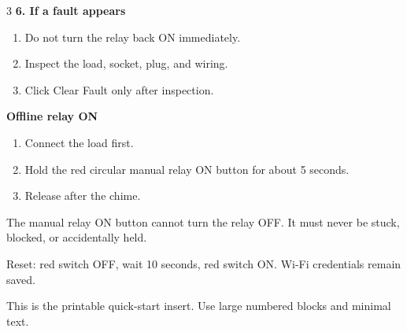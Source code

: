\documentclass[10pt,a4paper,landscape]{article}
\begin{document}
\begin{multicols}{3}
\textbf{6. If a fault appears}
\begin{enumerate}
  \item Do not turn the relay back ON immediately.
  \item Inspect the load, socket, plug, and wiring.
  \item Click Clear Fault only after inspection.
\end{enumerate}

\columnbreak

\textbf{Offline relay ON}
\begin{enumerate}
  \item Connect the load first.
  \item Hold the red circular manual relay ON button for about 5 seconds.
  \item Release after the chime.
\end{enumerate}

\begin{warningbox}
The manual relay ON button cannot turn the relay OFF. It must never be stuck, blocked, or accidentally held.
\end{warningbox}

\begin{notebox}
Reset: red switch OFF, wait 10 seconds, red switch ON. Wi-Fi credentials remain saved.
\end{notebox}
\end{multicols}

\begin{layoutbox}
This is the printable quick-start insert. Use large numbered blocks and minimal text.
\end{layoutbox}
\end{document}
